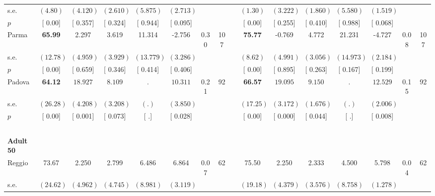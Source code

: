 \begin{longtable}{L{8em} c c c c c c c p{1em} c c c c c c c}
\quad \quad \quad \quad s.e.& $ (     4.80)$ & $ (    4.120)$ & $ (    2.610)$ & $ (    5.875)$ & $ (    2.713)$ & & & & $ (     1.30)$ & $ (    3.222)$ & $ (    1.860)$ & $ (    5.580)$ & $ (    1.519)$ & &  \\*
\quad \quad \quad \quad $ p$ & [     0.00] & [    0.357] & [    0.324] & [    0.944] & [    0.095] & & & & [     0.00] & [    0.255] & [    0.410] & [    0.988] & [    0.068] & &  \\[1em]
\quad \quad \quad Parma& \textbf{    65.99} &     2.297 &     3.619 &    11.314 &    -2.756 &      0.30 &       107 & & \textbf{    75.77} &    -0.769 &     4.772 &    21.231 &    -4.727 &      0.08 &       107  \\*
\quad \quad \quad \quad s.e.& $ (    12.78)$ & $ (    4.959)$ & $ (    3.929)$ & $ (   13.779)$ & $ (    3.286)$ & & & & $ (     8.62)$ & $ (    4.991)$ & $ (    3.056)$ & $ (   14.973)$ & $ (    2.184)$ & &  \\*
\quad \quad \quad \quad $ p$ & [     0.00] & [    0.659] & [    0.346] & [    0.414] & [    0.406] & & & & [     0.00] & [    0.895] & [    0.263] & [    0.167] & [    0.199] & &  \\[1em]
\quad \quad \quad Padova& \textbf{    64.12} & $ \mathbf{   18.927}$ & $ \mathbf{    8.109}$ &         . & $ \mathbf{   10.311}$ &      0.21 &        92 & & \textbf{    66.57} & $ \mathbf{   19.095}$ & $ \mathbf{    9.150}$ &         . & $ \mathbf{   12.529}$ &      0.15 &        92  \\*
\quad \quad \quad \quad s.e.& $ (    26.28)$ & $ (    4.208)$ & $ (    3.208)$ & $ (        .)$ & $ (    3.850)$ & & & & $ (    17.25)$ & $ (    3.172)$ & $ (    1.676)$ & $ (        .)$ & $ (    2.006)$ & &  \\*
\quad \quad \quad \quad $ p$ & [     0.00] & [    0.001] & [    0.073] & [        .] & [    0.028] & & & & [     0.00] & [    0.000] & [    0.044] & [        .] & [    0.008] & &  \\[1em]
~\\[1em]
\quad \quad \textbf{Adult 50} & & & & & & & & & & & & & & & \\* 
\quad \quad \quad Reggio& 73.67 &     2.250 &     2.799 &     6.486 &     6.864 &      0.07 &        62 & & 75.50 &     2.250 &     2.333 &     4.500 &     5.798 &      0.04 &        62  \\*
\quad \quad \quad \quad s.e.& $ (    24.62)$ & $ (    4.962)$ & $ (    4.745)$ & $ (    8.981)$ & $ (    3.119)$ & & & & $ (    19.18)$ & $ (    4.379)$ & $ (    3.576)$ & $ (    8.758)$ & $ (    1.278)$ & &  \\*

\end{longtable}
